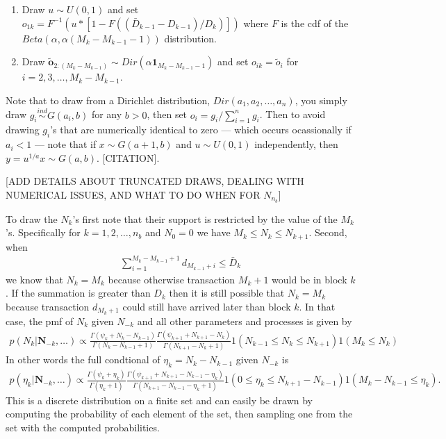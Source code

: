 \documentclass{article}
\begin{document}
\begin{enumerate}
\item Draw $u \sim U(0,1)$ and set $o_{1k} = F^{-1}(u*[1 - F((\bar{D}_{k-1} - D_{k-1})/D_k)])$ where $F$ is the cdf of the $Beta(\alpha, \alpha(M_k - M_{k-1} - 1))$ distribution.
\item Draw $\widetilde{\bm{o}}_{2:(M_k - M_{k-1})}\sim Dir(\alpha\bm{1}_{M_k - M_{k-1} - 1})$ and set $o_{ik} = \widetilde{o}_i$ for $i = 2,3,\dots,M_k - M_{k-1}$.
\end{enumerate}

Note that to draw from a Dirichlet distribution, $Dir(a_1, a_2, \dots, a_n)$, you simply draw $g_i\stackrel{ind}{\sim} G(a_i,b)$ for any $b>0$, then set $o_i = g_i/\sum_{i=1}^ng_i$. Then to avoid drawing $g_i$'s that are numerically identical to zero --- which occurs ocassionally if $a_i < 1$ --- note that if $x\sim G(a+1,b)$ and $u\sim U(0,1)$ independently, then $y = u^{1/a}x \sim G(a,b)$. [CITATION].

[ADD DETAILS ABOUT TRUNCATED DRAWS, DEALING WITH NUMERICAL ISSUES, AND WHAT TO DO WHEN FOR $N_{n_b}$]

To draw the $N_k$'s first note that their support is restricted by the value of the $M_k$'s. Specifically for $k=1,2,\dots,n_b$ and $N_0 = 0$ we have $M_k \le N_k \le N_{k+1}$. Second, when 
\begin{align*}
\sum_{i=1}^{M_k - M_{k-1} + 1}d_{M_{k-1} + i} \le \bar{D}_k
\end{align*}
we know that $N_k = M_k$ because otherwise transaction $M_k + 1$ would be in block $k$. If the summation is greater than $D_k$ then it is still possible that $N_k = M_k$ because transaction $d_{M_k + 1}$ could still have arrived later than block $k$. In that case, the pmf of $N_k$ given $N_{-k}$ and all other parameters and processes is given by
\begin{align*}
p(N_k|\bm{N}_{-k}, \dots) \propto \frac{\Gamma(\psi_k + N_k - N_{k-1})}{\Gamma(N_k - N_{k-1} + 1)} \frac{\Gamma(\psi_{k+1} + N_{k+1} - N_{k})}{\Gamma(N_{k+1} - N_{k} + 1)}1(N_{k-1}\le N_k \le N_{k+1})1(M_k\le N_k)
\end{align*}
In other words the full condtional of $\eta_k = N_k - N_{k-1}$ given $N_{-k}$ is
\begin{align*}
p(\eta_k|\bm{N}_{-k}, \dots) \propto \frac{\Gamma(\psi_k + \eta_k)}{\Gamma(\eta_k + 1)} \frac{\Gamma(\psi_{k+1} + N_{k+1} - N_{k-1} -\eta_k)}{\Gamma(N_{k+1} - N_{k-1} - \eta_k + 1)}1(0\le \eta_k \le N_{k+1} - N_{k-1})1(M_k - N_{k-1}\le \eta_k).
\end{align*}
This is a discrete distribution on a finite set and can easily be drawn by computing the probability of each element of the set, then sampling one from the set with the computed probabilities.
\end{document}
